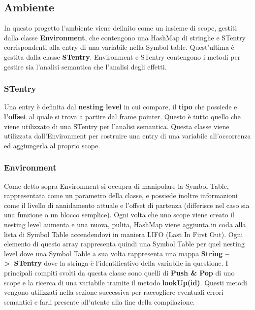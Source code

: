 \documentclass[../../main]{subfiles}
\begin{document}
\subsection{Ambiente}
In questo progetto l'ambiente viene definito come un insieme di scope, gestiti dalla classe \textbf{Environment}, che contengono una HashMap
di stringhe e STentry corrispondenti alla entry di una variabile nella Symbol table. Quest'ultima è gestita dalla classe \textbf{STentry}.
Environment e STentry contengono i metodi per gestire sia l'analisi semantica che l'analisi degli effetti.

\subsubsection{STentry}
Una entry è definita dal \textbf{nesting level} in cui compare, il \textbf{tipo} che possiede e \textbf{l'offset} al quale si trova a partire dal frame pointer.
Questo è tutto quello che viene utilizzato di una STentry per l'analisi semantica. Questa classe viene utilizzata dall'Environment per costruire una
entry di una variabile all'occorrenza ed aggiungerla al proprio scope.

\subsubsection{Environment}
Come detto sopra Environment si occupra di manipolare la Symbol Table, rappresentata come un parametro della classe, e possiede inoltre informazioni
come il livello di annidamento attuale e l'offset di partenza (differisce nel caso sia una funzione o un blocco semplice).
Ogni volta che uno scope viene creato il nesting level aumenta e una nuova, pulita, HashMap viene aggiunta in coda alla lista di Symbol Table
accendendovi in maniera LIFO (Last In First Out).
Ogni elemento di questo array rappresenta quindi una Symbol Table per quel nesting level dove una Symbol Table a sua volta rappresenta una mappa
\textbf{String --\textgreater\ STentry} dove la stringa è l'identificativo della variabile in questione.
I principali compiti svolti da questa classe sono quelli di \textbf{Push \& Pop} di uno scope e la ricerca di una variabile tramite il metodo
\textbf{lookUp(id)}. 
Questi metodi vengono utilizzati nella sezione successiva per raccogliere eventuali errori semantici e farli presente all'utente alla fine della compilazione.
\end{document}
